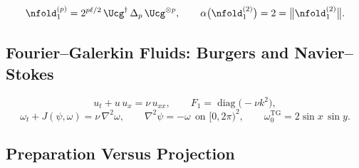 \begin{proposition}
\label{prop:fold-optimal}
\begin{equation}
    \nfold_1^{(p)} = 2^{p\ell/2}\,\Ucg^{\dagger}\,\Delta_p\,\Ucg^{\otimes p},
    \qquad
    \alpha\bigl(\nfold_1^{(2)}\bigr) = 2 = \bigl\|\nfold_1^{(2)}\bigr\| .
    \label{eq:nodal-fold}
\end{equation}
\end{proposition}

\subsection{Fourier--Galerkin Fluids: Burgers and Navier--Stokes}
\label{sec:fluids}

\begin{equation}
    u_t + u\,u_x = \nu\,u_{xx},
    \qquad
    F_1 = \operatorname{diag}\bigl(-\nu k^2\bigr),
    \label{eq:burgers}
\end{equation}
\begin{equation}
    \omega_t + J(\psi, \omega) = \nu\,\nabla^2\omega,
    \qquad
    \nabla^2\psi = -\omega \ \ \text{on } [0, 2\pi)^2,
    \qquad
    \omega_0^{\mathrm{TG}} = 2\sin x\,\sin y .
    \label{eq:navier-stokes}
\end{equation}

\subsection{Preparation Versus Projection}
\label{sec:prep-vs-proj}

